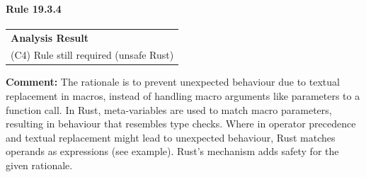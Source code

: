 \paragraph{Rule 19.3.4}
\begin{longtable}{p{13cm}}
\textbf{Analysis Result} \\
(C4) Rule still required (unsafe Rust) \\
\end{longtable}
\textbf{Comment:} The rationale is to prevent unexpected behaviour due to textual replacement in \Cpp macros, instead of handling macro arguments like parameters to a function call. In Rust, meta-variables are used to match macro parameters, resulting in behaviour that resembles type checks. Where in \Cpp operator precedence and textual replacement might lead to unexpected behaviour, Rust matches operands as expressions (see example). Rust's mechanism adds safety for the given rationale. \\


